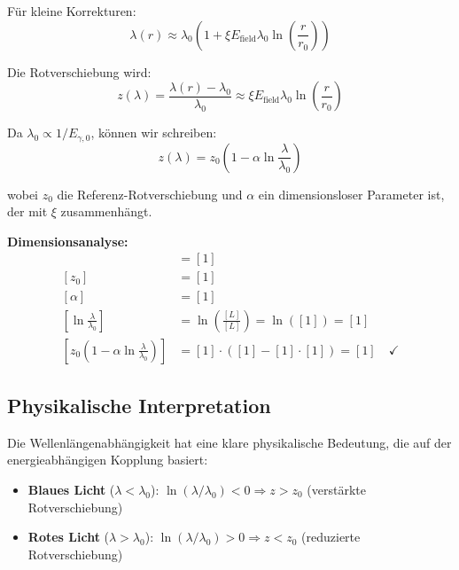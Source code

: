 \documentclass[12pt,a4paper]{report}
\begin{document}
	Für kleine Korrekturen:
	\begin{equation}
		\lambda(r) \approx \lambda_0 \left(1 + \xi E_{\text{field}} \lambda_0 \ln\left(\frac{r}{r_0}\right)\right)
	\end{equation}
	
	Die Rotverschiebung wird:
	\begin{equation}
		z(\lambda) = \frac{\lambda(r) - \lambda_0}{\lambda_0} \approx \xi E_{\text{field}} \lambda_0 \ln\left(\frac{r}{r_0}\right)
	\end{equation}
	
	Da $\lambda_0 \propto 1/E_{\gamma,0}$, können wir schreiben:
	\begin{equation}
		\boxed{z(\lambda) = z_0\left(1 - \alpha \ln\frac{\lambda}{\lambda_0}\right)}
		\label{eq:wavelength_dependent_redshift}
	\end{equation}
	
	wobei $z_0$ die Referenz-Rotverschiebung und $\alpha$ ein dimensionsloser Parameter ist, der mit $\xi$ zusammenhängt.
	
	\textbf{Dimensionsanalyse:}
	\begin{align}
		[z(\lambda)] &= [1] \\
		[z_0] &= [1] \\
		[\alpha] &= [1] \\
		\left[\ln\frac{\lambda}{\lambda_0}\right] &= \ln\left(\frac{[L]}{[L]}\right) = \ln([1]) = [1] \\
		\left[z_0\left(1 - \alpha \ln\frac{\lambda}{\lambda_0}\right)\right] &= [1] \cdot ([1] - [1] \cdot [1]) = [1] \quad \checkmark
	\end{align}
	
	\subsection{Physikalische Interpretation}
	\label{subsec:physical_interpretation_redshift}
	
	Die Wellenlängenabhängigkeit hat eine klare physikalische Bedeutung, die auf der energieabhängigen Kopplung basiert:
	\begin{itemize}
		\item \textbf{Blaues Licht} ($\lambda < \lambda_0$): $\ln(\lambda/\lambda_0) < 0 \Rightarrow z > z_0$ (verstärkte Rotverschiebung)
		\item \textbf{Rotes Licht} ($\lambda > \lambda_0$): $\ln(\lambda/\lambda_0) > 0 \Rightarrow z < z_0$ (reduzierte Rotverschiebung)
	\end{itemize}
	
\end{document}
